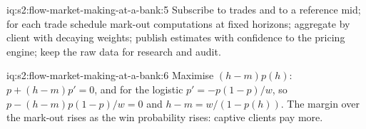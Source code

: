 \begin{solution}{iq:s2:flow-market-making-at-a-bank:5}
Subscribe to trades and to a reference mid; for each trade schedule mark-out computations at fixed horizons; aggregate by client with decaying
weights; publish estimates with confidence to the pricing engine; keep the raw data for research and audit.
\end{solution}

\begin{solution}{iq:s2:flow-market-making-at-a-bank:6}
Maximise $(h - m)p(h)$: $p + (h - m)p' = 0$, and for the logistic $p' = -p(1-p)/w$, so $p - (h - m)p(1-p)/w = 0$ and $h - m = w/(1 - p(h))$. The
margin over the mark-out rises as the win probability rises: captive clients pay more.
\end{solution}
